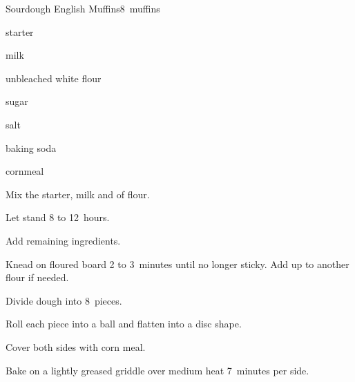\begin{recipe}{Sourdough English Muffins}{}{8~muffins}

\begin{ingredients}
\item {} starter
\item {} milk
\item {} unbleached white flour
\item {} sugar
\item \tp{\threequarter} salt
\item \tp{\half} baking soda
\item cornmeal
\end{ingredients}

\begin{directions}
\item Mix the starter, milk and  of flour.
\item Let stand 8 to 12~hours.
\item Add remaining ingredients.
\item Knead on floured board 2 to 3~minutes until no longer sticky. Add up to another \C{\quarter} flour if needed.
\item Divide dough into 8~pieces.
\item Roll each piece into a ball and flatten into a disc shape.
\item Cover both sides with corn meal.
\item Bake on a lightly greased griddle over medium heat 7~minutes per side.
\end{directions}

\end{recipe}
